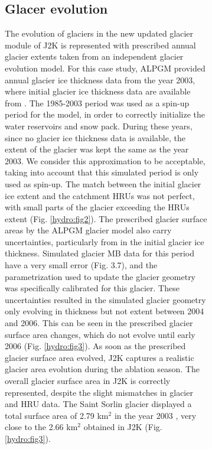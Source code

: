 \begin{figure}[h]
\begin{figure}[h]
\subsection{Glacer evolution}

The evolution of glaciers in the new updated glacier module of J2K is represented with prescribed annual glacier extents taken from an independent glacier evolution model. For this case study, ALPGM provided annual glacier ice thickness data from the year 2003, where initial glacier ice thickness data are available from \citet{farinotti_consensus_2019}. The 1985-2003 period was used as a spin-up period for the model, in order to correctly initialize the water reservoirs and snow pack. During these years, since no glacier ice thickness data is available, the extent of the glacier was kept the same as the year 2003. We consider this approximation to be acceptable, taking into account that this simulated period is only used as spin-up. The match between the initial glacier ice extent and the catchment HRUs was not perfect, with small parts of the glacier exceeding the HRUs extent (Fig. \ref{hydro:fig2}). The prescribed glacier surface areas by the ALPGM glacier model also carry uncertainties, particularly from in the initial glacier ice thickness. Simulated glacier MB data for this period have a very small error (Fig. 3.7), and the parametrization used to update the glacier geometry was specifically calibrated for this glacier. These uncertainties resulted in the simulated glacier geometry only evolving in thickness but not extent between 2004 and 2006. This can be seen in the prescribed glacier surface area changes, which do not evolve until early 2006 (Fig. \ref{hydro:fig3}). As soon as the prescribed glacier surface area evolved, J2K captures a realistic glacier area evolution during the ablation season. The overall glacier surface area in J2K is correctly represented, despite the slight mismatches in glacier and HRU data. The Saint Sorlin glacier displayed a total surface area of 2.79 km$^{2}$ in the year 2003 \citep{gardent_multitemporal_2014}, very close to the 2.66 km$^{2}$ obtained in J2K (Fig. \ref{hydro:fig3}). 


\end{figure}
\end{figure}
